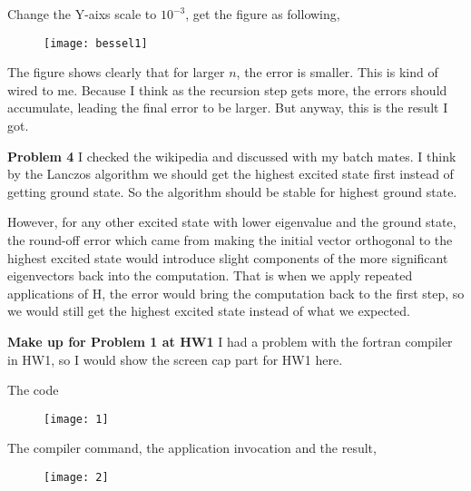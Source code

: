 \documentclass{article}
\begin{document}
  
Change the Y-aixs scale to  $10^{-3}$, get the figure as following,
\begin{figure} [ht]
\texttt{[image: bessel1]}
\end{figure}

The figure shows clearly that for larger $n$, the error is smaller.  This is kind of wired to me.  Because I think as the recursion step gets more, the errors should accumulate, leading the final error to be larger.  But anyway, this is the result I got.

\vskip 1cm
\textbf{Problem 4}
I checked the wikipedia and discussed with my batch mates.  I think by the Lanczos algorithm we should get the highest excited state first instead of getting ground state.  So the algorithm should be stable for highest ground state.  

However, for any other excited state with lower eigenvalue and the ground state, the round-off error which came from making the initial vector orthogonal to the highest excited state would introduce slight components of the more significant eigenvectors back into the computation.  That is when we apply repeated applications of H, the error would bring the computation back to the first step, so we would still get the highest excited state instead of what we expected.




\newpage
\textbf{Make up for Problem 1 at HW1}
I had a problem with the fortran compiler in HW1, so I would show the screen cap part for HW1 here.

The code
\begin{figure} [ht]
\texttt{[image: 1]}
\end{figure}

The compiler command, the application invocation and the result,
\begin{figure} [ht]
\texttt{[image: 2]}
\end{figure}
\end{document}
